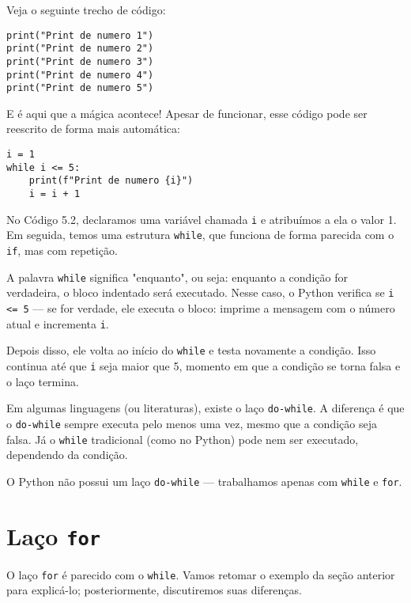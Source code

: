 \documentclass[12pt]{book}
\begin{document}
	Veja o seguinte trecho de código:
	
	\begin{lstlisting}[caption={Printando repetidas vezes}]
print("Print de numero 1")
print("Print de numero 2")
print("Print de numero 3")
print("Print de numero 4")
print("Print de numero 5")\end{lstlisting}
	
	E é aqui que a mágica acontece!  
	Apesar de funcionar, esse código pode ser reescrito de forma mais automática:
	
	\begin{lstlisting}[caption={Printando com while}]
i = 1
while i <= 5:
	print(f"Print de numero {i}")
	i = i + 1\end{lstlisting}
	
	No Código 5.2, declaramos uma variável chamada \verb*|i| e atribuímos a ela o valor 1. Em seguida, temos uma estrutura \verb*|while|, que funciona de forma parecida com o \verb*|if|, mas com repetição.
	
	A palavra \texttt{while} significa "enquanto", ou seja: enquanto a condição for verdadeira, o bloco indentado será executado.  
	Nesse caso, o Python verifica se \texttt{i <= 5} — se for verdade, ele executa o bloco: imprime a mensagem com o número atual e incrementa \verb*|i|.
	
	Depois disso, ele volta ao início do \verb*|while| e testa novamente a condição. Isso continua até que \verb*|i| seja maior que 5, momento em que a condição se torna falsa e o laço termina.
	
	\begin{tcolorbox}[colback=gray!10, colframe=black, title={\large\bfseries Observação}]
		Em algumas linguagens (ou literaturas), existe o laço \texttt{do-while}. A diferença é que o \texttt{do-while} sempre executa pelo menos uma vez, mesmo que a condição seja falsa. Já o \texttt{while} tradicional (como no Python) pode nem ser executado, dependendo da condição.
		
		O Python não possui um laço \texttt{do-while} — trabalhamos apenas com \texttt{while} e \texttt{for}.
	\end{tcolorbox}
	
	\section{Laço \texttt{for}}
	
	O laço \texttt{for} é parecido com o \texttt{while}. Vamos retomar o exemplo da seção anterior para explicá-lo; posteriormente, discutiremos suas diferenças.
	
\end{document}
